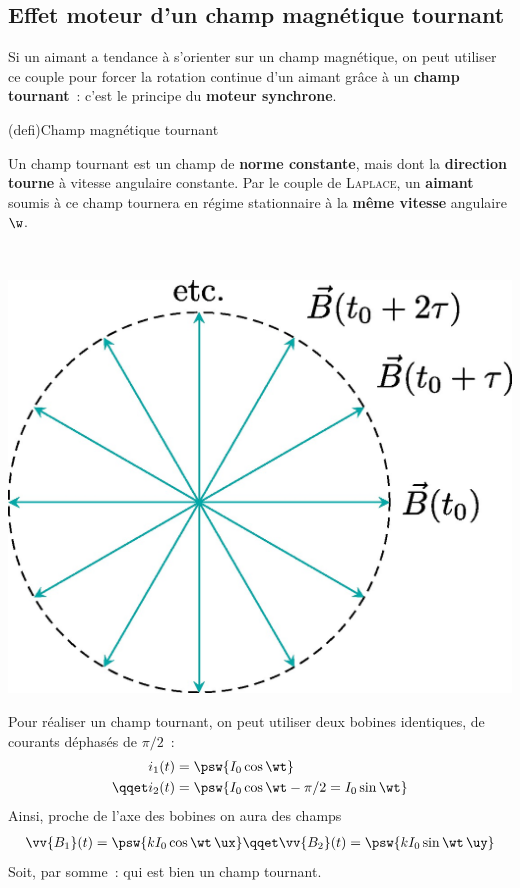 \documentclass[../../main/main.tex]{subfiles}
\begin{document}
\subsection{Effet moteur d'un champ magnétique tournant}
\label{ssec:btourne}
Si un aimant a tendance à s'orienter sur un champ magnétique, on peut utiliser
ce couple pour forcer la rotation continue d'un aimant grâce à un \textbf{champ
	tournant}~: c'est le principe du \textbf{moteur synchrone}.
\begin{tcb}(defi){Champ magnétique tournant}
	\begin{minipage}[c]{.6\linewidth}
		Un champ tournant est un champ de \textbf{norme constante}, mais dont la
		\textbf{direction tourne} à vitesse angulaire constante.
		\smallbreak
		Par le couple de \textsc{Laplace}, un \textbf{aimant} soumis à ce champ tournera en
		régime stationnaire à la \textbf{même vitesse} angulaire $\w$.
	\end{minipage}
	\hfill
	\begin{minipage}[c]{.4\linewidth}
		~
		\begin{center}
			\includegraphics[scale=.9]{btourn1}
			\captionsetup{justification=centering}
			\label{fig:btourn1}
		\end{center}
	\end{minipage}
\end{tcb}
\noindent
\begin{minipage}[t]{.64\linewidth}
	Pour réaliser un champ tournant, on peut utiliser deux bobines identiques, de
	courants déphasés de $\pi/2$~:
	\begin{align*}
		i_1(t) & = \psw{I_0\cos{\wt}}
		\\\qqet
		i_2(t) & = \psw{I_0\cos{\wt-\pi/2} = I_0\sin{\wt}}
	\end{align*}
	Ainsi, proche de l'axe des bobines on aura des champs
	\begin{gather*}
		\vv{B_1}(t) = \psw{k I_0\cos{\wt}\,\ux}
		\qqet
		\vv{B_2}(t) = \psw{k I_0\sin{\wt}\,\uy}
	\end{gather*}
	Soit, par somme~:
	\psw{%
		\[
			\boxed{\vv{B} = k I_0 (\cos{\wt}\ux + \sin{\wt}\uy) = k I_0\ur}
		\]
	}%
	qui est bien un champ tournant.
\end{minipage}
\end{document}
